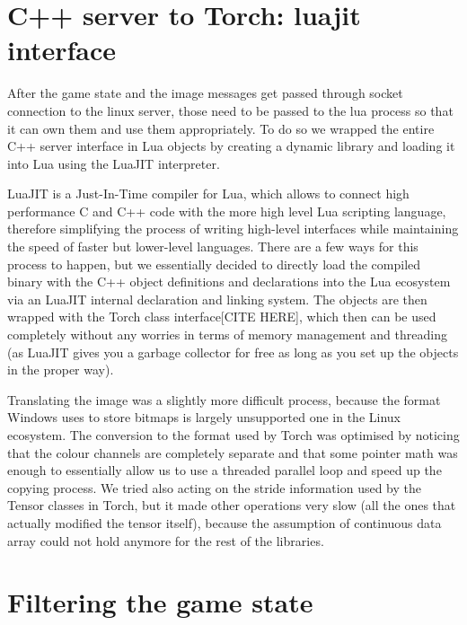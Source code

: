 \section{C++ server to Torch: luajit interface}

After the game state and the image messages get passed through socket connection
to the linux server, those need to be passed to the lua process so that it can
own them and use them appropriately. To do so we wrapped the entire C++ server
interface in Lua objects by creating a dynamic library and loading it into Lua
using the LuaJIT interpreter.

LuaJIT is a Just-In-Time compiler for Lua, which allows to connect high
performance C and C++ code with the more high level Lua scripting language,
therefore simplifying the process of writing high-level interfaces while
maintaining the speed of faster but lower-level languages. There are a few ways
for this process to happen, but we essentially decided to directly load the
compiled binary with the C++ object definitions and declarations into the Lua
ecosystem via an LuaJIT internal declaration and linking system. The objects are
then wrapped with the Torch class interface[CITE HERE], which then can be used
completely without any worries in terms of memory management and threading (as
LuaJIT gives you a garbage collector for free as long as you set up the objects
in the proper way).

Translating the image was a slightly more difficult process, because the format
Windows uses to store bitmaps is largely unsupported one in the Linux ecosystem.
The conversion to the format used by Torch was optimised by noticing that the
colour channels are completely separate and that some pointer math was enough to
essentially allow us to use a threaded parallel loop and speed up the copying
process. We tried also acting on the stride information used by the Tensor
classes in Torch, but it made other operations very slow (all the ones that
actually modified the tensor itself), because the assumption of continuous data
array could not hold anymore for the rest of the libraries.

\section{Filtering the game state}


